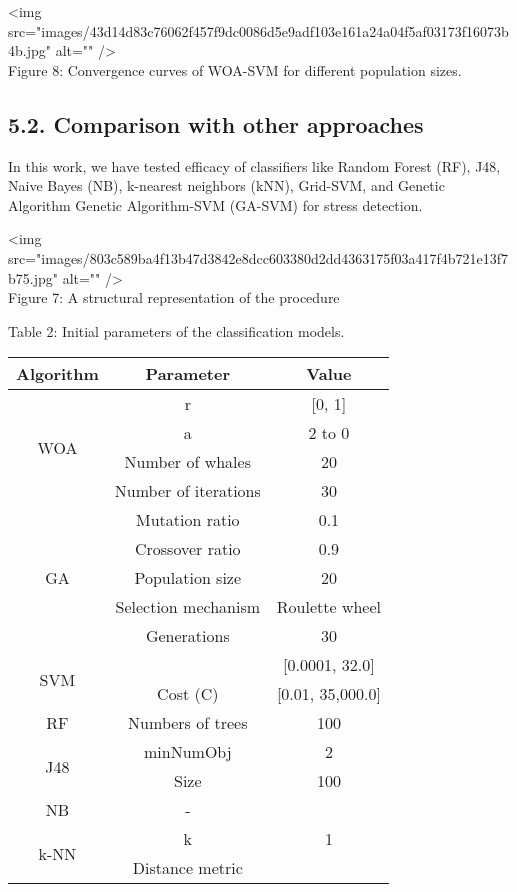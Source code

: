 \documentclass{article}
\begin{document}
<img src="images/43d14d83c76062f457f9dc0086d5e9adf103e161a24a04f5af03173f16073b4b.jpg" alt="" />\\
Figure 8: Convergence curves of WOA-SVM for different population sizes.

\subsection{5.2. Comparison with other approaches}

In this work, we have tested efficacy of classifiers like Random Forest (RF), J48, Naive Bayes (NB), k-nearest neighbors (kNN), Grid-SVM, and Genetic Algorithm Genetic Algorithm-SVM (GA-SVM) for stress detection.

<img src="images/803c589ba4f13b47d3842e8dcc603380d2dd4363175f03a417f4b721e13f7b75.jpg" alt="" />\\
Figure 7: A structural representation of the procedure

Table 2: Initial parameters of the classification models.

\begin{tabular}{|c|c|c|}\hline
Algorithm & Parameter & Value \\ \hline
\multirow{4}{*}{WOA} & r & [0, 1] \\ \cline{2-3}
  & a & 2 to 0 \\ \cline{2-3}
  & Number of whales & 20 \\ \cline{2-3}
  & Number of iterations & 30 \\ \hline
\multirow{5}{*}{GA} & Mutation ratio & 0.1 \\ \cline{2-3}
  & Crossover ratio & 0.9 \\ \cline{2-3}
  & Population size & 20 \\ \cline{2-3}
  & Selection mechanism & Roulette wheel \\ \cline{2-3}
  & Generations & 30 \\ \hline
\multirow{2}{*}{SVM} &  & [0.0001, 32.0] \\ \cline{2-3}
  & Cost (C) & [0.01, 35,000.0] \\ \hline
RF & Numbers of trees & 100 \\ \hline
\multirow{2}{*}{J48} & minNumObj & 2 \\ \cline{2-3}
  & Size & 100 \\ \hline
NB & - &  \\ \hline
\multirow{2}{*}{k-NN} & k & 1 \\ \cline{2-3}
  & Distance metric &  \\ \hline
\end{tabular}
\end{document}
